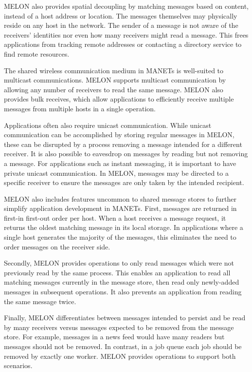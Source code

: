\documentclass{llncs}
\begin{document}
MELON also provides spatial decoupling by matching messages based on content, instead of a host address or location. The messages themselves may physically reside on any host in the network. The sender of a message is not aware of the receivers' identities nor even how many receivers might read a message. This frees applications from tracking remote addresses or contacting a directory service to find remote resources.

The shared wireless communication medium in MANETs is well-suited to multicast communications. MELON supports multicast communication by allowing any number of receivers to read the same message. MELON also provides bulk receives, which allow applications to efficiently receive multiple messages from multiple hosts in a single operation.

Applications often also require unicast communication. While unicast communication can be accomplished by storing regular messages in MELON, these can be disrupted by a process removing a message intended for a different receiver. It is also possible to eavesdrop on messages by reading but not removing a message. For applications such as instant messaging, it is important to have private unicast communication. In MELON, messages may be directed to a specific receiver to ensure the messages are only taken by the intended recipient.

MELON also includes features uncommon to shared message stores to further simplify application development in MANETs. First, messages are returned in first-in first-out order per host. When a host receives a message request, it returns the oldest matching message in its local storage. In applications where a single host generates the majority of the messages, this eliminates the need to order messages on the receiver side. 

Secondly, MELON provides operations to only read messages which were not previously read by the same process. This enables an application to read all matching messages currently in the message store, then read only newly-added messages in subsequent operations. It also prevents an application from reading the same message twice.

Finally, MELON differentiates between messages intended to persist and be read by many receivers versus messages expected to be removed from the message store. For example, messages in a news feed would have many readers but messages should not be removed. In contrast, in a job queue each job should be removed by exactly one worker. MELON provides operations to support both scenarios.
\end{document}
